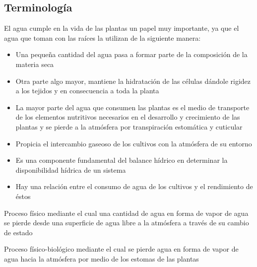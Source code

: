         \subsection{Terminología}
        El agua cumple en la vida de las plantas un papel muy importante,
        ya que el agua que toman con las raíces la utilizan de la siguiente
        manera:
        \begin{itemize}
            \item Una pequeña cantidad del agua pasa a formar parte de la
            composición de la materia seca
            \item Otra parte algo mayor, mantiene la hidratación de las células
            dándole rigidez a los tejidos y en consecuencia a toda la planta
            \item La mayor parte del agua que consumen las plantas es el medio de
            transporte de los elementos nutritivos necesarios en el desarrollo y
            crecimiento de las plantas y se pierde a la atmósfera por
            transpiración estomática y cuticular
            \item Propicia el intercambio gaseoso de los cultivos con la atmósfera de su entorno
            \item Es una componente fundamental del balance hídrico en determinar la disponibilidad hídrica de un sistema
            \item Hay una relación entre el consumo de agua de los cultivos y el
            rendimiento de éstos
        \end{itemize}
        
        
        \begin{definition}
            Proceso físico mediante el cual una cantidad de agua en forma de vapor de agua se pierde desde una superficie de agua libre a la atmósfera a través de su cambio de estado
        \end{definition}
        
        \begin{definition}[Transpiración]
            Proceso físico-biológico mediante el cual se pierde agua en forma de vapor de agua hacia la atmósfera por medio de los estomas de las plantas
        \end{definition}
        
